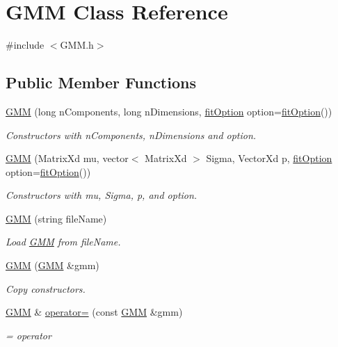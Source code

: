 \hypertarget{class_g_m_m}{\section{G\+M\+M Class Reference}
\label{class_g_m_m}
}


{\ttfamily \#include $<$G\+M\+M.\+h$>$}

\subsection*{Public Member Functions}
\begin{DoxyCompactItemize}
\item 
\hyperlink{class_g_m_m_a780eb798b963d64324e60f8a05511793}{G\+M\+M} (long n\+Components, long n\+Dimensions, \hyperlink{structfit_option}{fit\+Option} option=\hyperlink{structfit_option}{fit\+Option}())
\begin{DoxyCompactList}\small\item\em Constructors with n\+Components, n\+Dimensions and option. \end{DoxyCompactList}\item 
\hyperlink{class_g_m_m_a204c0939ce8e0544a70f6bacac70430e}{G\+M\+M} (Matrix\+Xd mu, vector$<$ Matrix\+Xd $>$ Sigma, Vector\+Xd p, \hyperlink{structfit_option}{fit\+Option} option=\hyperlink{structfit_option}{fit\+Option}())
\begin{DoxyCompactList}\small\item\em Constructors with mu, Sigma, p, and option. \end{DoxyCompactList}\item 
\hyperlink{class_g_m_m_a3fd2ad1e4b02532fbcc8c268f60b4ee8}{G\+M\+M} (string file\+Name)
\begin{DoxyCompactList}\small\item\em Load \hyperlink{class_g_m_m}{G\+M\+M} from file\+Name. \end{DoxyCompactList}\item 
\hyperlink{class_g_m_m_ae4a3fdfee01a1f37a58d405b701f1469}{G\+M\+M} (\hyperlink{class_g_m_m}{G\+M\+M} \&gmm)
\begin{DoxyCompactList}\small\item\em Copy constructors. \end{DoxyCompactList}\item 
\hyperlink{class_g_m_m}{G\+M\+M} \& \hyperlink{class_g_m_m_a60cc7218be23fa401a804b5d419632b9}{operator=} (const \hyperlink{class_g_m_m}{G\+M\+M} \&gmm)
\begin{DoxyCompactList}\small\item\em = operator \end{DoxyCompactList}\item 

\end{DoxyCompactItemize}
